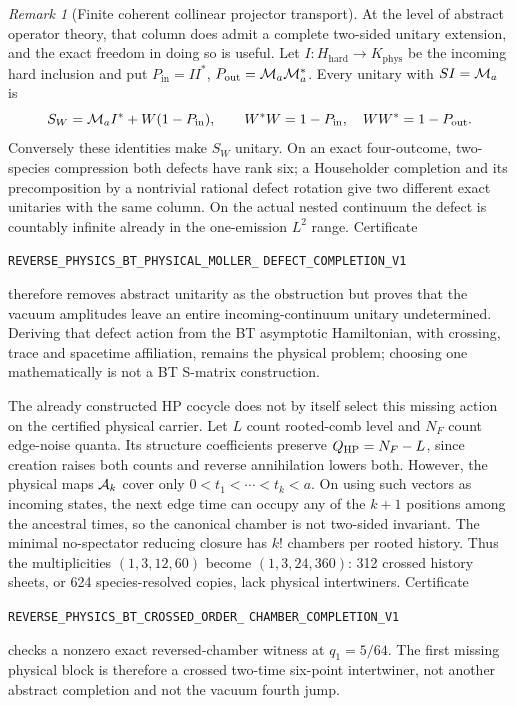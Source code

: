 \documentclass[11pt]{article}
\theoremstyle{definition}
\theoremstyle{remark}
\newtheorem{remark}[theorem]{Remark}
\begin{document}
\begin{remark}[Finite coherent collinear projector transport]
At the level of abstract operator theory, that column does admit a complete
two-sided unitary extension, and the exact freedom in doing so is useful.
Let $I:H_{\mathrm{hard}}\to K_{\mathrm{phys}}$ be the incoming hard inclusion and put
$P_{\mathrm{in}}=II^*$, $P_{\mathrm{out}}={\cal M}_a{\cal M}_a^*$.
Every unitary with $S I={\cal M}_a$ is
\[
 S_W={\cal M}_aI^*+W(1-P_{\rm in}),\qquad
 W^*W=1-P_{\rm in},\quad WW^*=1-P_{\rm out}.
\]
Conversely these identities make $S_W$ unitary.  On an exact four-outcome,
two-species compression both defects have rank six; a Householder completion
and its precomposition by a nontrivial rational defect rotation give two
different exact unitaries with the same column.  On the actual nested
continuum the defect is countably infinite already in the one-emission
$L^2$ range.  Certificate
\par\noindent
\texttt{REVERSE\_PHYSICS\_BT\_PHYSICAL\_MOLLER\_}
\allowbreak\texttt{DEFECT\_COMPLETION\_V1}
\par\noindent
therefore removes abstract unitarity as the obstruction but proves that the
vacuum amplitudes leave an entire incoming-continuum unitary undetermined.
Deriving that defect action from the BT asymptotic Hamiltonian, with crossing,
trace and spacetime affiliation, remains the physical problem; choosing one
mathematically is not a BT S-matrix construction.

The already constructed HP cocycle does not by itself select this missing
action on the certified physical carrier.  Let $L$ count rooted-comb level
and $N_F$ count edge-noise quanta.  Its structure coefficients preserve
$Q_{\rm HP}=N_F-L$, since creation raises both counts and reverse
annihilation lowers both.  However, the physical maps ${\cal A}_k$ cover
only $0<t_1<\cdots<t_k<a$.  On using such vectors as incoming states, the
next edge time can occupy any of the $k+1$ positions among the ancestral
times, so the canonical chamber is not two-sided invariant.  The minimal
no-spectator reducing closure has $k!$ chambers per rooted history.  Thus
the multiplicities $(1,3,12,60)$ become $(1,3,24,360)$: 312 crossed
history sheets, or 624 species-resolved copies, lack physical intertwiners.
Certificate
\par\noindent
\texttt{REVERSE\_PHYSICS\_BT\_CROSSED\_ORDER\_}
\allowbreak\texttt{CHAMBER\_COMPLETION\_V1}
\par\noindent
checks a nonzero exact reversed-chamber witness at $q_1=5/64$.  The first
missing physical block is therefore a crossed two-time six-point
intertwiner, not another abstract completion and not the vacuum fourth jump.


\end{remark}
\end{document}
